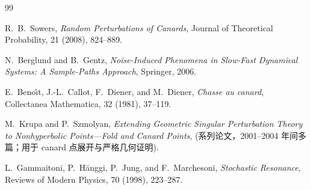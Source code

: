\documentclass[a4paper,twoside,openany,UTF8]{article}  %
\numberwithin{equation}{section}  %
\numberwithin{equation}{section}  %
\begin{document}
\begin{thebibliography}{99}
	
	R.\ B.\ Sowers,
	\newblock \textit{Random Perturbations of Canards},
	\newblock Journal of Theoretical Probability, 21 (2008), 824--889.
	
	N.\ Berglund and B.\ Gentz,
	\newblock \textit{Noise-Induced Phenomena in Slow-Fast Dynamical Systems: A Sample-Paths Approach},
	\newblock Springer, 2006.
	
	E.\ Beno\^{\i}t, J.-L.\ Callot, F.\ Diener, and M.\ Diener,
	\newblock \textit{Chasse au canard},
	\newblock Collectanea Mathematica, 32 (1981), 37--119.
	
	M.\ Krupa and P.\ Szmolyan,
	\newblock \textit{Extending Geometric Singular Perturbation Theory to Nonhyperbolic Points---Fold and Canard Points},
	\newblock (系列论文，2001--2004 年间多篇；用于 canard 点展开与严格几何证明).
	
	L.\ Gammaitoni, P.\ H\"anggi, P.\ Jung, and F.\ Marchesoni,
	\newblock \textit{Stochastic Resonance},
	\newblock Reviews of Modern Physics, 70 (1998), 223--287.
	
\end{thebibliography}
\end{document}
